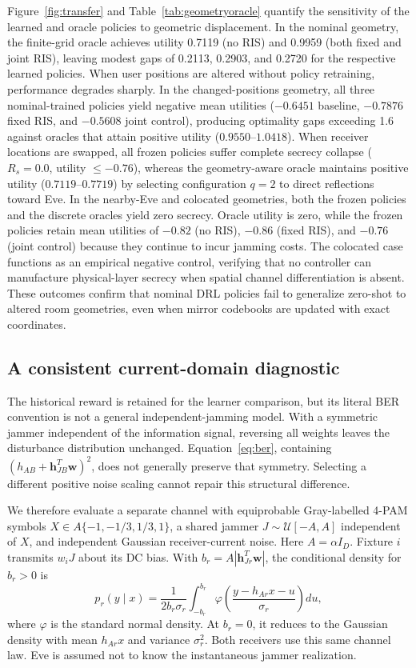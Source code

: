 \documentclass[journal,10pt,twocolumn]{IEEEtran}
\begin{document}
Figure~\ref{fig:transfer} and Table~\ref{tab:geometryoracle} quantify the sensitivity of the learned and oracle policies to geometric displacement. In the nominal geometry, the finite-grid oracle achieves utility 0.7119 (no RIS) and 0.9959 (both fixed and joint RIS), leaving modest gaps of 0.2113, 0.2903, and 0.2720 for the respective learned policies. When user positions are altered without policy retraining, performance degrades sharply. In the changed-positions geometry, all three nominal-trained policies yield negative mean utilities ($-0.6451$ baseline, $-0.7876$ fixed RIS, and $-0.5608$ joint control), producing optimality gaps exceeding 1.6 against oracles that attain positive utility ($0.9550$--$1.0418$). When receiver locations are swapped, all frozen policies suffer complete secrecy collapse ($R_s=0.0$, utility $\le -0.76$), whereas the geometry-aware oracle maintains positive utility ($0.7119$--$0.7719$) by selecting configuration $q=2$ to direct reflections toward Eve. In the nearby-Eve and colocated geometries, both the frozen policies and the discrete oracles yield zero secrecy. Oracle utility is zero, while the frozen policies retain mean utilities of $-0.82$ (no RIS), $-0.86$ (fixed RIS), and $-0.76$ (joint control) because they continue to incur jamming costs. The colocated case functions as an empirical negative control, verifying that no controller can manufacture physical-layer secrecy when spatial channel differentiation is absent. These outcomes confirm that nominal DRL policies fail to generalize zero-shot to altered room geometries, even when mirror codebooks are updated with exact coordinates.

\subsection{A consistent current-domain diagnostic}
The historical reward is retained for the learner comparison, but its literal BER convention is not a general independent-jamming model. With a symmetric jammer independent of the information signal, reversing all weights leaves the disturbance distribution unchanged. Equation~\eqref{eq:ber}, containing $(h_{AB}+\mathbf h_{JB}^{T}\mathbf w)^2$, does not generally preserve that symmetry. Selecting a different positive noise scaling cannot repair this structural difference.

We therefore evaluate a separate channel with equiprobable Gray-labelled 4-PAM symbols $X\in A\{-1,-1/3,1/3,1\}$, a shared jammer $J\sim\mathcal U[-A,A]$ independent of $X$, and independent Gaussian receiver-current noise. Here $A=\alpha I_D$. Fixture $i$ transmits $w_iJ$ about its DC bias. With $b_r=A|\mathbf h_{Jr}^{T}\mathbf w|$, the conditional density for $b_r>0$ is
\begin{equation}
p_r(y\mid x)=\frac{1}{2b_r\sigma_r}\int_{-b_r}^{b_r}
\varphi\!\left(\frac{y-h_{Ar}x-u}{\sigma_r}\right)du,
\label{eq:diagnosticdensity}
\end{equation}
where $\varphi$ is the standard normal density. At $b_r=0$, it reduces to the Gaussian density with mean $h_{Ar}x$ and variance $\sigma_r^2$. Both receivers use this same channel law. Eve is assumed not to know the instantaneous jammer realization.
\end{document}
